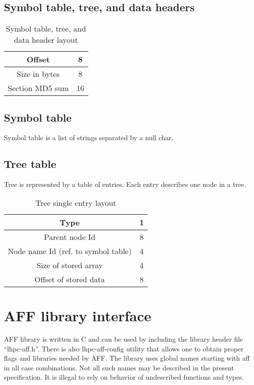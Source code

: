 \documentclass[10pt,letterpaper]{article}
\newcommand{\bc}{\begin{center}}
\newcommand{\ec}{\end{center}}
\begin{document}
\subsection{Symbol table, tree, and data headers}

\begin{table}[h]
\label{tab:table_header}
\bc
\caption{Symbol table, tree, and data header layout}
\begin{tabular}{|c|c|} \hline
Offset  & 8 \\ \hline
Size in bytes & 8 \\ \hline
Section MD5 sum & 16 \\ \hline
\end{tabular}
\ec
\end{table}

\subsection{Symbol table}
Symbol table is a list of strings separated by a null char.

\subsection{Tree table}
Tree is represented by a table of entries. Each entry describes one node in a tree.

\begin{table}[h]
\label{tab:tree_entry}
\bc
\caption{Tree single entry layout}
\begin{tabular}{|c|c|} \hline
Type & 1 \\ \hline
Parent node Id & 8 \\ \hline
Node name Id (ref. to symbol table) & 4 \\ \hline
Size of stored array & 4 \\ \hline
Offset of stored data & 8 \\ \hline
\end{tabular}
\ec
\end{table}

\newpage


\section{AFF library interface}
AFF library is written in C and can be used by including the library header file ``lhpc-aff.h''. 
There is also lhpc-aff-config utility that allows one to obtain proper flags 
and libraries needed by AFF.
The library uses global names starting with aff in all case combinations. 
Not all such names may be described in the present specification.
It is illegal to rely on behavior of undescribed functions and types.
\end{document}
